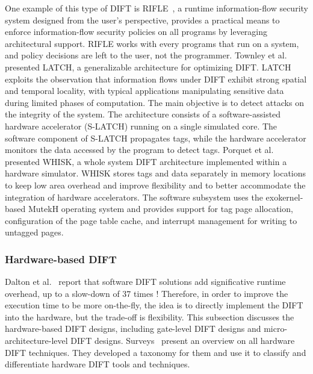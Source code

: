 One example of this type of DIFT is RIFLE~\cite{VBCROBRVA-04-micro}, a runtime information-flow security system designed from the user's perspective, provides a practical means to enforce information-flow security policies on all programs by leveraging architectural support. RIFLE works with every programs that run on a system, and policy decisions are left to the user, not the programmer.
Townley et al.~\cite{TKPAY-19-micro} presented LATCH, a generalizable architecture for optimizing DIFT. 
LATCH exploits the observation that information flows under DIFT exhibit strong spatial and temporal locality, with typical applications manipulating sensitive data during limited phases of computation. The main objective is to detect attacks on the integrity of the system. The architecture consists of a software-assisted hardware accelerator (S-LATCH) running on a single simulated core. The software component of S-LATCH propagates tags, while the hardware accelerator monitors the data accessed by the program to detect tags. 
Porquet et al.~\cite{PS-13-codes} presented WHISK, a whole system DIFT architecture implemented within a hardware simulator. WHISK stores tags and data separately in memory locations to keep low area overhead and improve flexibility and to better accommodate the integration of hardware accelerators. The software subsystem uses the exokernel-based MutekH operating system and provides support for tag page allocation, configuration of the page table cache, and interrupt management for writing to untagged pages.

\subsubsection{Hardware-based DIFT}
Dalton et al.~\cite{DKK-07-sigarch} report that software DIFT solutions add significative runtime overhead, up to a slow-down of 37 times ! Therefore, in order to improve the execution time to be more on-the-fly, the idea is to directly implement the DIFT into the hardware, but the trade-off is flexibility.
This subsection discusses the hardware-based DIFT designs, including gate-level DIFT designs and micro-architecture-level DIFT designs. Surveys~\cite{HAK-21-acmcsur,BSMCVEJCO-21-acmcsur} present an overview on all hardware DIFT techniques. They developed a taxonomy for them and use it to classify and differentiate hardware DIFT tools and techniques.

